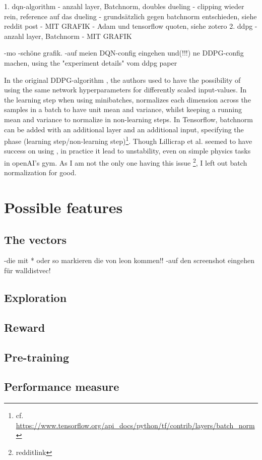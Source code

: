 1. dqn-algorithm
- anzahl layer, Batchnorm, doubles dueling
- clipping wieder rein, reference auf das dueling
- grundsätzlich gegen batchnorm entschieden, siehe reddit post
- MIT GRAFIK
- Adam und tensorflow quoten, siehe zotero
2. ddpg
- anzahl layer, Batchnorm
- MIT GRAFIK

-mo
-schöne grafik.
-auf meien DQN-config eingehen und(!!!) ne DDPG-config machen, using the "experiment details" vom ddpg paper  


In the original DDPG-algorithm \cite{lillicrap_continuous_2015}, the authors used  \cite{ioffe_batch_2015} to have the possibility of using the same network hyperparameters for differently scaled input-values. In the learning step when using minibatches, \batchnorm normalizes each dimension across the samples in a batch to have unit mean and variance, whilst keeping a running mean and variance to normalize in non-learning steps. In Tensorflow, batchnorm can be added with an additional layer and an additional input, specifying the phase (learning step/non-learning step)\footnote{cf. \url{https://www.tensorflow.org/api\_docs/python/tf/contrib/layers/batch_norm}}. Though Lillicrap et al. seemed to have success on using \batchnorm, in practice it lead to unstability, even on simple physics tasks in openAI's gym. As I am not the only one having this issue \footnote{redditlink}, I left out batch normalization for good.





\section{Possible features}

\label{ch:possiblefeatures}

\subsection{The vectors}

\label{ch:thevectors}
-die mit * oder so markieren die von leon kommen!!
-auf den screenshot eingehen für walldistvec!

\subsection{Exploration}

\subsection{Reward}

\subsection{Pre-training}

\subsection{Performance measure}

